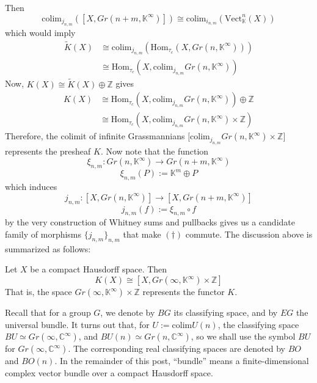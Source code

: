 \documentclass[11pt,a4paper]{article}
\begin{document}
Then
$$\text{colim}_{j_{n,m}}([X, Gr(n+m, \mathbb{K}^{\infty})]) \cong \text{colim}_{i_{n,m}}(\text{Vect}_{\mathbb{K}}^n(X))$$
which would imply
\begin{equation*}
\begin{split}
    \widetilde{K}(X) & \cong \text{colim}_{j_{n,m}}(\text{Hom}_{\tau_c}(X, Gr(n, \mathbb{K}^{\infty})))\\
    & \cong \text{Hom}_{\tau_c}(X, \text{colim}_{j_{n,m}}Gr(n, \mathbb{K}^{\infty}))
\end{split}
\end{equation*}
Now, $K(X) \cong \widetilde{K}(X) \oplus \mathbb{Z}$ gives
\begin{equation*}
\begin{split}
    K(X) & \cong \text{Hom}_{\tau_c}(X, \text{colim}_{j_{n,m}}Gr(n, \mathbb{K}^{\infty})) \oplus \mathbb{Z}\\
    & \cong \text{Hom}_{\tau_c}(X, \text{colim}_{j_{n,m}}Gr(n, \mathbb{K}^{\infty})\times \mathbb{Z})
\end{split}
\end{equation*}
Therefore, the colimit of infinite Grassmannians $\big[\text{colim}_{j_{n,m}}Gr(n, \mathbb{K}^{\infty})\times \mathbb{Z}\big]$ represents the presheaf $K$. Now note that the function
$$\xi_{n,m}: Gr(n, \mathbb{K}^{\infty}) \rightarrow Gr(n+m, \mathbb{K}^{\infty})$$
$$\xi_{n,m}(P):= \mathbb{K}^m\oplus P$$
which induces
$$j_{n, m}: [X, Gr(n, \mathbb{K}^{\infty})] \rightarrow [X, Gr(n+m, \mathbb{K}^{\infty})]$$
$$j_{n,m}(f):= \xi_{n,m}\circ f$$
by the very construction of Whitney sums and pullbacks gives us a candidate family of morphisms $\{j_{n,m}\}_{n,m}$ that make $(\dagger)$ commute. The discussion above is summarized as follows:
\begin{theorem}
    Let $X$ be a compact Hausdorff space. Then $$K(X) \cong [X, Gr(\infty, \mathbb{K}^{\infty})\times \mathbb{Z}]$$
That is, the space $Gr(\infty, \mathbb{K}^{\infty})\times \mathbb{Z}$ represents the functor $K$.
\end{theorem}

\begin{remark}[Notation]
Recall that for a group $G$, we denote by $BG$ its classifying space, and by $EG$ the universal bundle. It turns out that, for $U:= \text{colim} U(n)$, the classifying space $BU \simeq Gr(\infty, \mathbb{C}^{\infty})$, and $BU(n) \simeq Gr(n, \mathbb{C}^{\infty})$, so we shall use the symbol $BU$ for $Gr(\infty, \mathbb{C}^{\infty})$. The corresponding real classifying spaces are denoted by $BO$ and $BO(n)$. In the remainder of this post, ``bundle'' means a finite-dimensional complex vector bundle over a compact Hausdorff space.
\end{remark}
\end{document}
